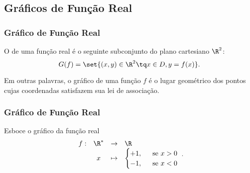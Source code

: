 \begin{frame}
    \section{Gráficos de Função Real}
    \frametitle{Gráfico de Função Real} 
    
    \begin{definicao}
    O  de uma função real é o seguinte subconjunto do plano
    cartesiano $\R^2$: $$G(f) = \set{(x,y) \in \R^2 \tq x \in D , y =
    f(x)}.$$
    \end{definicao}
    Em outras palavras, o gráfico de uma função $f$ é o lugar geométrico
    dos pontos cujas coordenadas satisfazem sua lei de associação.
    
    \end{frame}
    
    
    
    
    \begin{frame}
    \frametitle{Gráfico de Função Real} 
    
    \begin{exemplo}
    Esboce o gráfico da função real
    $$\begin{array}{cccl}
    f : & \R^\ast & \to     & \R \\
             &  x & \mapsto & \begin{cases}
                                                    +1,  &  \ \text{ se } x >0 \\
                                                    -1, &  \ \text{ se } x <0
                                                    \end{cases}
    \end{array}.$$
    \end{exemplo}
    
    \end{frame}
    
    

